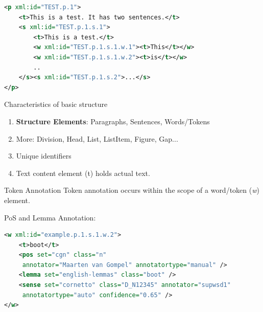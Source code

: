 \documentclass[compress,10pt]{beamer}
\begin{document}
\begin{frame}[fragile]
	\begin{example}
\begin{lstlisting}[language=xml]
<p xml:id="TEST.p.1">
	<t>This is a test. It has two sentences.</t>
	<s xml:id="TEST.p.1.s.1">        
	    <t>This is a test.</t>
	    <w xml:id="TEST.p.1.s.1.w.1"><t>This</t></w>
	    <w xml:id="TEST.p.1.s.1.w.2"><t>is</t></w>
	    ..
	</s><s xml:id="TEST.p.1.s.2">...</s>                
</p>                
\end{lstlisting}    
	\end{example}

    \begin{block}{Characteristics of basic structure}
      \begin{enumerate}
        \item \textbf{Structure Elements}: Paragraphs, Sentences, Words/Tokens  
        \item More: Division, Head, List, ListItem, Figure, Gap...
        \item Unique identifiers
        \item Text content element (t) holds actual text.
      \end{enumerate}
    \end{block}
\end{frame}



\begin{frame}[fragile]
    \begin{block}{Token Annotation}
        Token annotation occurs within the scope of a word/token (\emph{w}) element.
    \end{block}
    \begin{example}
       PoS and Lemma Annotation:
\begin{lstlisting}[language=xml]
<w xml:id="example.p.1.s.1.w.2">
    <t>boot</t>
    <pos set="cgn" class="n" 
     annotator="Maarten van Gompel" annotatortype="manual" />
    <lemma set="english-lemmas" class="boot" />
    <sense set="cornetto" class="D_N12345" annotator="supwsd1" 
     annotatortype="auto" confidence="0.65" />
</w>                         
\end{lstlisting}        
    \end{example}
\end{frame}
\end{document}
